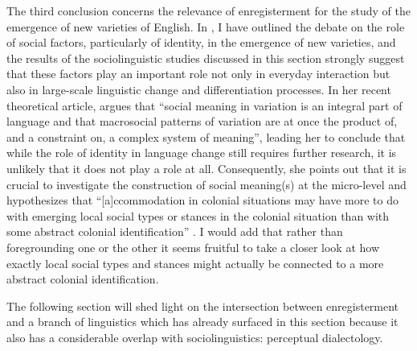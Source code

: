 The third conclusion concerns the relevance of enregisterment for the study of the emergence of new varieties of English. In , I have outlined the debate on the role of social factors, particularly of identity, in the emergence of new varieties, and the results of the sociolinguistic studies discussed in this section strongly suggest that these factors play an important role not only in everyday interaction but also in large-scale linguistic change and differentiation processes. In her recent theoretical article, \citet[68]{Eckert2016} argues that “social meaning in variation is an integral part of language and that macrosocial patterns of variation are at once the product of, and a constraint on, a complex system of meaning”, leading her to conclude that while the role of identity in language change still requires further research, it is unlikely that it does not play a role at all. Consequently, she points out that it is crucial to investigate the construction of social meaning(s) at the micro-level and hypothesizes that “[a]ccommodation in colonial situations may have more to do with emerging local social types or stances in the colonial situation than with some abstract colonial identification” \citep[82]{Eckert2016}. I would add that rather than foregrounding one or the other it seems fruitful to take a closer look at how exactly local social types and stances might actually be connected to a more abstract colonial identification.

The following section will shed light on the intersection between enregisterment and a branch of linguistics which has already surfaced in this section because it also has a considerable overlap with sociolinguistics: perceptual dialectology.

